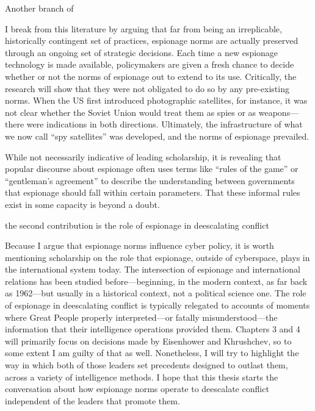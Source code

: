 \documentclass[14pt]{extarticle}
\begin{document}

Another branch of


I break from this literature by arguing that far from being an irreplicable, historically contingent set of practices, espionage norms are actually preserved through an ongoing set of strategic decisions. Each time a new espionage technology is made available, policymakers are given a fresh chance to decide whether or not the norms of espionage out to extend to its use. Critically, the research will show that they were not obligated to do so by any pre-existing norms. When the US first introduced photographic satellites, for instance, it was not clear whether the Soviet Union would treat them as spies or as weapons---there were indications in both directions. Ultimately, the infrastructure of what we now call \enquote{spy satellites} was developed, and the norms of espionage prevailed.

While not necessarily indicative of leading scholarship, it is revealing that popular discourse about espionage often uses terms like \enquote{rules of the game} or \enquote{gentleman's agreement} to describe the understanding between governments that espionage should fall within certain parameters. That these informal rules exist in some capacity is beyond a doubt.


the second contribution is the role of espionage in deescalating conflict

Because I argue that espionage norms influence cyber policy, it is worth mentioning scholarship on the role that espionage, outside of cyberspace, plays in the international system today. The intersection of espionage and international relations has been studied before---beginning, in the modern context, as far back as 1962---but usually in a historical context, not a political science one. The role of espionage in deescalating conflict is typically relegated to accounts of moments where Great People properly interpreted---or fatally misunderstood---the information that their intelligence operations provided them. Chapters 3 and 4 will primarily focus on decisions made by Eisenhower and Khrushchev, so to some extent I am guilty of that as well. Nonetheless, I will try to highlight the way in which both of those leaders set precedents designed to outlast them, across a variety of intelligence methods. I hope that this thesis starts the conversation about how espionage norms operate to deescalate conflict independent of the leaders that promote them.
\end{document}
